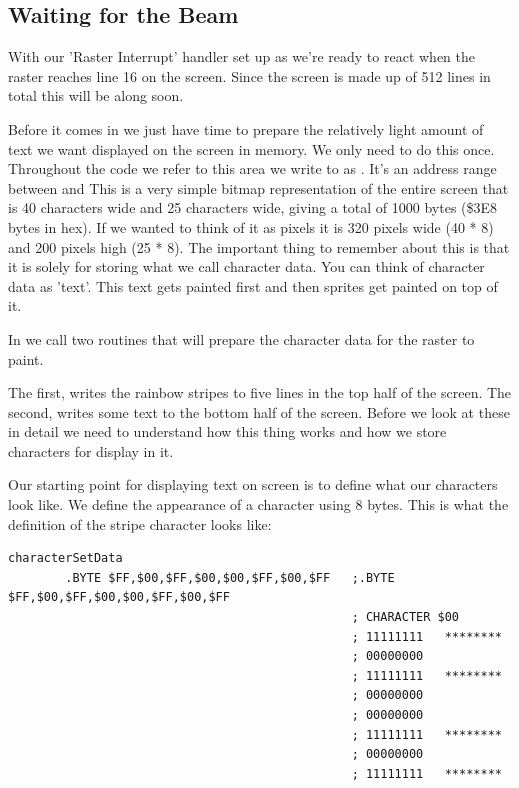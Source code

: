 \subsection{Waiting for the Beam}
With our 'Raster Interrupt' handler set up as  we're ready to 
react when the raster reaches line 16 on the screen. Since the screen is made up of 512 lines in
total this will be along soon.

Before it comes in we just have time to prepare the relatively light amount of text we want displayed
on the screen in memory. We only need to do this once. Throughout the code we refer to this
area we write to as . It's an address range between  and  This is a very
simple bitmap representation of the entire screen that is 40 characters wide and 25 characters wide,
giving a total of 1000 bytes (\$3E8 bytes in hex). If we wanted to think of it as pixels it is 320 pixels wide (40 * 8)
and 200 pixels high (25 * 8). The important thing to remember about this  is that it is solely
for storing what we call character data. You can think of character data as 'text'. This text gets painted
first and then sprites get painted on top of it.

In  we call two routines that will prepare the character data for the raster to paint. 

The first,  writes the rainbow stripes to five lines in the top half of the screen. 
The second,  writes some text to the bottom half of the screen. Before we look at these
in detail we need to understand how this thing  works and how we store characters for display in it.

Our starting point for displaying text on screen is to define what our characters look like. We define the appearance
of a character using 8 bytes. This is what the definition of the stripe character looks like: 

\begin{lstlisting}[caption= The 'stripe' character.,basicstyle=\tiny]
characterSetData
        .BYTE $FF,$00,$FF,$00,$00,$FF,$00,$FF   ;.BYTE $FF,$00,$FF,$00,$00,$FF,$00,$FF
                                                ; CHARACTER $00
                                                ; 11111111   ********
                                                ; 00000000           
                                                ; 11111111   ********
                                                ; 00000000           
                                                ; 00000000           
                                                ; 11111111   ********
                                                ; 00000000           
                                                ; 11111111   ********
\end{lstlisting}

